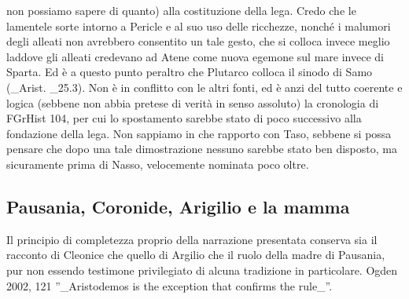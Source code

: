 non possiamo sapere di quanto) alla costituzione della lega. Credo che le lamentele sorte intorno a Pericle e al suo uso delle ricchezze, nonché i malumori degli alleati non avrebbero consentito un tale gesto, che si colloca invece meglio laddove gli alleati credevano ad Atene come nuova egemone sul mare invece di Sparta. Ed è  a questo punto peraltro che Plutarco colloca il sinodo di Samo (_Arist. _25.3). Non è in conflitto con le altri fonti, ed è anzi del tutto coerente e logica (sebbene non abbia pretese di verità in senso assoluto) la cronologia di FGrHist 104, per cui lo spostamento sarebbe stato di poco successivo alla fondazione della lega. Non sappiamo in che rapporto con Taso, sebbene si possa pensare che dopo una tale dimostrazione nessuno sarebbe stato ben disposto, ma sicuramente prima di Nasso, velocemente nominata poco oltre. 
            \subsection*{Pausania,  Coronide, Arigilio e la mamma}
            Il principio di completezza proprio della narrazione presentata conserva sia il racconto di Cleonice che quello di Argilio  che il ruolo della madre di Pausania, pur non essendo testimone privilegiato di alcuna tradizione in particolare. Ogden 2002, 121 ''_Aristodemos is the exception that confirms the rule_''.
